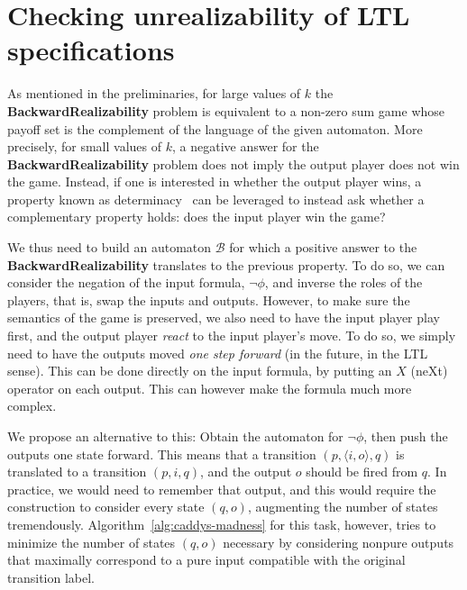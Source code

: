 \documentclass[runningheads,a4paper]{llncs}
\begin{document}
\section{Checking unrealizability of LTL specifications}\label{sec:unreal}

As mentioned in the preliminaries, for large values of $k$ the 
\textbf{BackwardRealizability} problem is equivalent to a non-zero sum game
whose payoff set is the complement of the language of the given automaton.
More precisely, for small values of $k$, a negative answer for the
\textbf{BackwardRealizability} problem does not imply the output player does
not win the game. Instead, if one is interested in whether the output player
wins, a property known as determinacy~\cite{borel} can be leveraged to instead
ask whether a complementary property holds: does the input player win the
game?

We thus need to build an automaton \(\mathcal{B}\) for which a positive answer to
the \textbf{BackwardRealizability} translates to the previous property.  To do
so, we can consider the negation of the input formula, \(\neg\phi\), and inverse the
roles of the players, that is, swap the inputs and outputs.  However, to make
sure the semantics of the game is preserved, we also need to have the input
player play first, and the output player \emph{react} to the input player's
move.  To do so, we simply need to have the outputs moved \emph{one step
  forward} (in the future, in the LTL sense).  This can be done directly on the
input formula, by putting an \(X\) (neXt) operator on each output.  This can
however make the formula much more complex.

We propose an alternative to this: Obtain the automaton for \(\neg \phi\), then push the
outputs one state forward. This means that a transition \((p, \langle i, o \rangle, q)\) is
translated to a transition \((p, i, q)\), and the output \(o\) should be fired from
\(q\).  In practice, we would need to remember that output, and this would require
the construction to consider every state \((q, o)\), augmenting the number of
states tremendously.  Algorithm~\ref{alg:caddys-madness} for this task, however,
tries to minimize the number of states \((q, o)\) necessary by considering nonpure
outputs that maximally correspond to a pure input compatible with the
original transition label.
\end{document}
